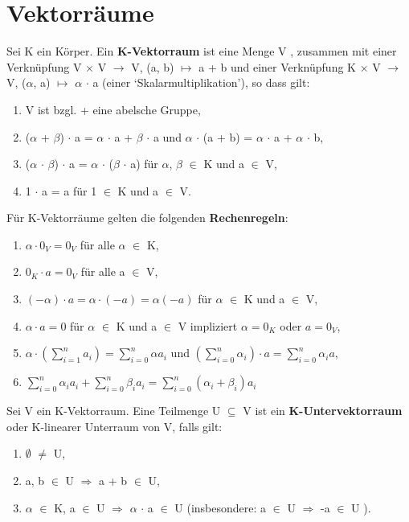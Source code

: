 \section{Vektorräume}
\begin{definition}
Sei K ein Körper. Ein \textbf{K-Vektorraum} ist eine Menge V , zusammen mit einer Verknüpfung V $\times$ V $\to$ V, (a, b) $\mapsto$ a + b und einer Verknüpfung K $\times$ V $\to$ V, ($\alpha$, a) $\mapsto$ $\alpha$ $\cdot$ a (einer ‘Skalarmultiplikation’), so dass gilt:
\begin{enumerate}
\item V ist bzgl. + eine abelsche Gruppe,
\item ($\alpha$ + $\beta$) $\cdot$ a = $\alpha$ $\cdot$ a + $\beta$ $\cdot$ a und $\alpha$ $\cdot$ (a + b) = $\alpha$ $\cdot$ a + $\alpha$ $\cdot$ b,
\item ($\alpha$ $\cdot$ $\beta$) $\cdot$ a = $\alpha$ $\cdot$ ($\beta$ $\cdot$ a) für $\alpha$, $\beta$ $\in$ K und a $\in$ V,
\item 1 $\cdot$ a = a für 1 $\in$ K und a $\in$ V.
\end{enumerate}
\end{definition}

Für K-Vektorräume gelten die folgenden \textbf{Rechenregeln}:
\begin{enumerate}
\item $\alpha \cdot 0_V = 0_V$ für alle $\alpha$ $\in$ K,
\item $0_K \cdot a = 0_V$  für alle a $\in$ V,
\item $(-\alpha) \cdot a = \alpha \cdot (-a) = \alpha(-a)$ für $\alpha$ $\in$ K und a $\in$ V,
\item $\alpha \cdot a = 0$ für $\alpha$ $\in$ K und a $\in$ V impliziert $\alpha = 0_K$ oder $a = 0_V$,
\item $\alpha \cdot (\sum\nolimits_{i=1}^{n} a_i) = \sum\nolimits_{i=0}^{n} \alpha a_i$ und $(\sum\nolimits_{i=0}^{n}\alpha_i) \cdot a = \sum\nolimits_{i=0}^{n} \alpha_i a$,
\item $\sum\nolimits_{i=0}^{n} \alpha_i a_i + \sum\nolimits_{i=0}^{n} \beta_i a_i = \sum\nolimits_{i=0}^{n} (\alpha_i + \beta_i) a_i$
\end{enumerate}

\begin{definition}
Sei V ein K-Vektorraum. Eine Teilmenge U $\subseteq$ V ist ein \textbf{K-Untervektorraum} oder K-linearer Unterraum von V, falls gilt:
\begin{enumerate}
\item $\emptyset$ $\neq$ U,
\item a, b $\in$ U $\Rightarrow$ a + b $\in$ U,
\item $\alpha$ $\in$ K, a $\in$ U $\Rightarrow$ $\alpha$ $\cdot$ a $\in$ U (insbesondere: a $\in$ U $\Rightarrow$ -a $\in$ U ).
\end{enumerate}
\end{definition}

